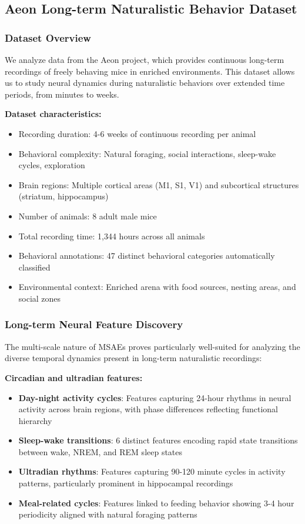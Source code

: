 \subsection{Aeon Long-term Naturalistic Behavior Dataset}

\subsubsection{Dataset Overview}

We analyze data from the Aeon project, which provides continuous long-term recordings of freely behaving mice in enriched environments. This dataset allows us to study neural dynamics during naturalistic behaviors over extended time periods, from minutes to weeks.

\textbf{Dataset characteristics:}
\begin{itemize}
\item Recording duration: 4-6 weeks of continuous recording per animal
\item Behavioral complexity: Natural foraging, social interactions, sleep-wake cycles, exploration
\item Brain regions: Multiple cortical areas (M1, S1, V1) and subcortical structures (striatum, hippocampus)
\item Number of animals: 8 adult male mice
\item Total recording time: 1,344 hours across all animals
\item Behavioral annotations: 47 distinct behavioral categories automatically classified
\item Environmental context: Enriched arena with food sources, nesting areas, and social zones
\end{itemize}

\subsubsection{Long-term Neural Feature Discovery}

The multi-scale nature of MSAEs proves particularly well-suited for analyzing the diverse temporal dynamics present in long-term naturalistic recordings:

\textbf{Circadian and ultradian features:}
\begin{itemize}
\item \textbf{Day-night activity cycles}: Features capturing 24-hour rhythms in neural activity across brain regions, with phase differences reflecting functional hierarchy
\item \textbf{Sleep-wake transitions}: 6 distinct features encoding rapid state transitions between wake, NREM, and REM sleep states
\item \textbf{Ultradian rhythms}: Features capturing 90-120 minute cycles in activity patterns, particularly prominent in hippocampal recordings
\item \textbf{Meal-related cycles}: Features linked to feeding behavior showing 3-4 hour periodicity aligned with natural foraging patterns
\end{itemize}

